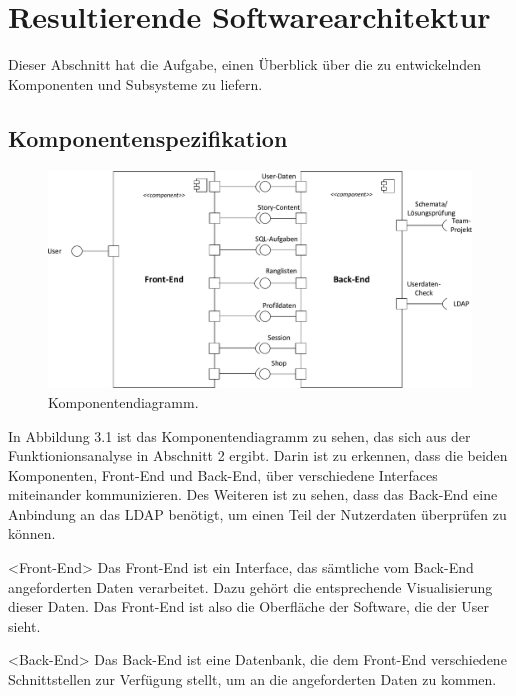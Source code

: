 
\chapter{Resultierende Softwarearchitektur}\label{chap:architektur}

Dieser Abschnitt hat die Aufgabe, einen Überblick über die zu entwickelnden
Komponenten und Subsysteme zu liefern.

\section{Komponentenspezifikation}

\begin{figure}[ht]
\centering
\includegraphics[width=1\textwidth]{figures/komponenten_anfang.pdf}
\caption{Komponentendiagramm.}
\label{component}
\end{figure}

\newpage
In Abbildung 3.1 ist das Komponentendiagramm zu sehen, das sich aus der Funktionionsanalyse in Abschnitt 2 ergibt. Darin ist zu erkennen, dass die beiden Komponenten, Front-End und Back-End, über verschiedene Interfaces miteinander kommunizieren. Des Weiteren ist zu sehen, dass das Back-End eine Anbindung an das LDAP benötigt, um einen Teil der Nutzerdaten überprüfen zu können. 


\begin{component}{10}{<Front-End>}
Das Front-End ist ein Interface, das sämtliche vom Back-End angeforderten Daten verarbeitet. Dazu gehört die entsprechende Visualisierung dieser Daten. Das Front-End ist also die Oberfläche der Software, die der User sieht.
\end{component}

\begin{component}{20}{<Back-End>}
Das Back-End ist eine Datenbank, die dem Front-End verschiedene Schnittstellen zur Verfügung stellt, um an die angeforderten Daten zu kommen.
\end{component}

